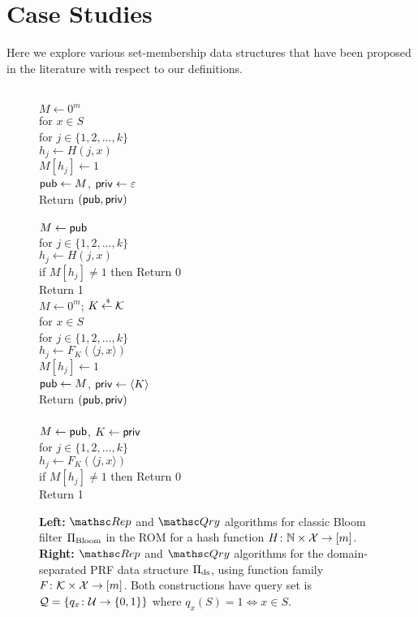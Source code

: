 \section{Case Studies}
Here we explore various set-membership data structures that have been proposed
in the literature with respect to our definitions.


\begin{figure}[tp]
\centering
{}
{
\\
$M \gets 0^m$\\
for $x \in S$\\
\nudge for $j \in \{1,2,\ldots,k\}$\\
\nudge\nudge $h_j \gets H(j,x)$\\
\nudge\nudge $M[h_j] \gets 1$\\
${\sf pub} \gets M$, ${\sf priv} \gets \varepsilon$\\
Return $({\sf pub},{\sf priv})$\\

\medskip
{}\\
$M\gets{\sf pub}$\\
for $j \in \{1,2,\ldots,k\}$\\
\nudge $h_j \gets H(j,x)$\\
\nudge if $M[h_j] \neq 1$ then Return 0\\
Return 1
}
{
\\
$M \gets 0^m$; $K {\:\stackrel{{\scriptscriptstyle \hspace{0.2em}\$}} {\leftarrow}\:} {\cal K}$\\
for $x \in S$\\
\nudge for $j \in \{1,2,\ldots,k\}$\\
\nudge\nudge $h_j \gets F_{K}(\langle j,x \rangle) $\\
\nudge\nudge $M[h_j] \gets 1$\\
${\sf pub} \gets M$, ${\sf priv} \gets \langle K \rangle$\\
Return $({\sf pub},{\sf priv})$\\

\medskip
{}\\
$M\gets{\sf pub}$, $K \gets {\sf priv}$\\
for $j \in \{1,2,\ldots,k\}$\\
\nudge $h_j \gets F_{K}(\langle j,x \rangle) $\\
\nudge if $M[h_j] \neq 1$ then Return 0\\
Return 1
}
\caption{{\bf Left:} $\Rep$ and $\Qry$ algorithms for classic Bloom
  filter $\Pi_{\mathrm{Bloom}}$ in the ROM for a hash function $H\colon \mathbb{N} \times
  {\cal X} \to [m]$. {\bf Right:} $\Rep$ and $\Qry$
  algorithms for the domain-separated PRF data structure
  $\Pi_{\mathrm{ds}}$, using function family $F \colon
  {\cal K} \times {\cal X} \to [m]$.  Both constructions have query set is ${\cal Q}=\{q_x\colon
  {\cal U} \to \{0,1\}\}$ where $q_x(S)=1 \Leftrightarrow x \in S$.  }
\label{fig:bf-and-ds}
\end{figure}

